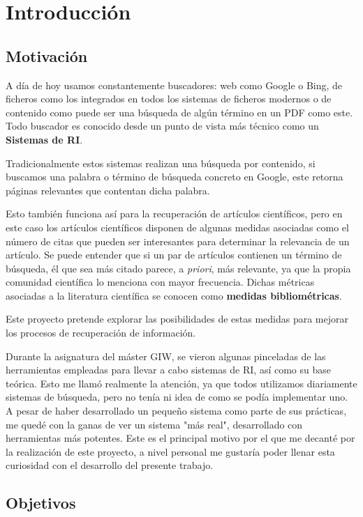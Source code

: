 \chapter{Introducción}
\section{Motivación}

A día de hoy usamos constantemente buscadores: web como Google o Bing, de ficheros como los integrados en todos los sistemas de ficheros modernos o de contenido como puede ser una búsqueda de algún término en un \acrshort{PDF} como este. Todo buscador es conocido desde un punto de vista más técnico como un \textbf{Sistemas de \acrfull{RI}}. 

Tradicionalmente estos sistemas realizan una búsqueda por contenido, si buscamos una palabra o término de búsqueda concreto en Google, este retorna páginas relevantes que contentan dicha palabra. 

Esto también funciona así para la recuperación de artículos científicos, pero en este caso los artículos científicos disponen de algunas medidas asociadas como el número de citas que pueden ser interesantes para determinar la relevancia de un artículo. Se puede entender que si un par de artículos contienen un término de búsqueda, él que sea más citado parece, a \textit{priori}, más relevante, ya que la propia comunidad científica lo menciona con mayor frecuencia. Dichas métricas asociadas a la literatura científica se conocen como \textbf{medidas bibliométricas}.

Este proyecto pretende explorar las posibilidades de estas medidas para mejorar los procesos de recuperación de información.

Durante la asignatura del máster \acrfull{GIW}, se vieron algunas pinceladas de las herramientas empleadas para llevar a cabo sistemas de \acrlong{RI}, así como su base teórica. Esto me llamó realmente la atención, ya que todos utilizamos diariamente sistemas de búsqueda, pero no tenía ni idea de como se podía implementar uno. A pesar de haber desarrollado un pequeño sistema como parte de sus prácticas, me quedé con la ganas de ver un sistema "más real", desarrollado con herramientas más potentes. Este es el principal motivo por el que me decanté por la realización de este proyecto, a nivel personal me gustaría poder llenar esta curiosidad con el desarrollo del presente trabajo.

\section{Objetivos}

